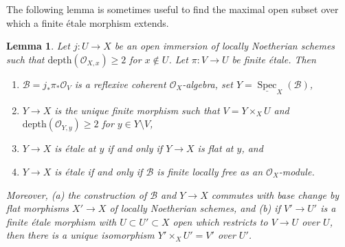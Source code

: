 \documentclass{stacks-project}
\theoremstyle{plain}
\newtheorem{lemma}[subsection]{Lemma}
\theoremstyle{definition}
\theoremstyle{remark}
\numberwithin{equation}{subsection}
\def\Spec{\mathop{\mathrm{Spec}}}
\begin{document}
\noindent
The following lemma is sometimes useful to find the maximal
open subset over which a finite \'etale morphism extends.

\begin{lemma}
\label{lemma-extend-S2}
Let $j : U \to X$ be an open immersion of locally Noetherian schemes
such that $\text{depth}(\mathcal{O}_{X, x}) \geq 2$ for $x \not \in U$.
Let $\pi : V \to U$ be finite \'etale. Then
\begin{enumerate}
\item $\mathcal{B} = j_*\pi_*\mathcal{O}_V$ is a reflexive coherent
$\mathcal{O}_X$-algebra, set $Y = \underline{\Spec}_X(\mathcal{B})$,
\item $Y \to X$ is the unique finite morphism such that
$V = Y \times_X U$ and $\text{depth}(\mathcal{O}_{Y, y}) \geq 2$
for $y \in Y \setminus V$,
\item $Y \to X$ is \'etale at $y$ if and only if $Y \to X$ is flat at $y$, and
\item $Y \to X$ is \'etale if and only if $\mathcal{B}$
is finite locally free as an $\mathcal{O}_X$-module.
\end{enumerate}
Moreover, (a) the construction of $\mathcal{B}$ and $Y \to X$ commutes
with base change by flat morphisms $X' \to X$ of locally Noetherian
schemes, and (b) if $V' \to U'$ is a finite \'etale morphism with
$U \subset U' \subset X$ open which restricts to $V \to U$ over $U$,
then there is a unique isomorphism $Y' \times_X U' = V'$ over $U'$.
\end{lemma}
\end{document}
